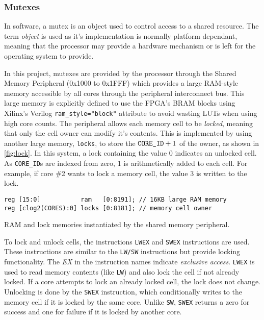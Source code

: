 \subsubsection{Mutexes}
In software, a mutex is an object used to control access to a shared resource. The term \textit{object} is used as it's implementation is normally platform dependant, meaning that the processor may provide a hardware mechanism or is left for the operating system to provide.

In this project, mutexes are provided by the processor through the Shared Memory Peripheral (0x1000 to 0x1FFF) which provides a large RAM-style memory accessible by all cores through the peripheral interconnect bus. This large memory is explicitly defined to use the FPGA's BRAM blocks using Xilinx's Verilog \verb|ram_style="block"| attribute to avoid wasting LUTs when using high core counts. The peripheral allows each memory cell to be \textit{locked}, meaning that only the cell owner can modify it's contents. This is implemented by using another large memory, \verb|locks|, to store the $\verb|CORE_ID| + 1$ of the owner, as shown in \cref{fig:lock}. In this system, a lock containing the value 0 indicates an unlocked cell. As \verb|CORE_ID|s are indexed from zero, 1 is arithmetically added to each cell. For example, if core \#2 wants to lock a memory cell, the value 3 is written to the lock.

\begin{listing}[h]
\centering
\begin{verbatim}
reg [15:0]           ram   [0:8191]; // 16KB large RAM memory
reg [clog2(CORES):0] locks [0:8181]; // memory cell owner
\end{verbatim}
\caption{RAM and lock memories instantiated by the shared memory peripheral.}
\label{fig:lock}
\end{listing}

To lock and unlock cells, the instructions \verb|LWEX| and \verb|SWEX| instructions are used. These instructions are similar to the \verb|LW/SW| instructions but provide locking functionality. The \textit{EX} in the instruction names indicate \textit{exclusive access}. \verb|LWEX| is used to read memory contents  (like \verb|LW|) and also lock the cell if not already locked. If a core attempts to lock an already locked cell, the lock does not change. Unlocking is done by the \verb|SWEX| instruction, which conditionally writes to the memory cell if it is locked by the same core. Unlike \verb|SW|, \verb|SWEX| returns a zero for success and one for failure if it is locked by another core.

